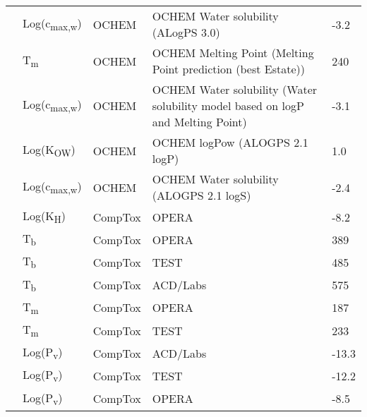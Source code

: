 \begin{landscape}
\begin{longtable}[c]{lllll}
          & Log(c\textsubscript{max,w}) & OCHEM      & OCHEM Water solubility (ALogPS 3.0)                                             & -3.2  \\
          & T\textsubscript{m}          & OCHEM      & OCHEM Melting Point (Melting Point prediction (best Estate))                    & 240   \\
          & Log(c\textsubscript{max,w}) & OCHEM      & OCHEM Water solubility (Water solubility model based on logP and Melting Point) & -3.1  \\
          & Log(K\textsubscript{OW})      & OCHEM      & OCHEM logPow (ALOGPS 2.1 logP)                                                  & 1.0   \\
          & Log(c\textsubscript{max,w}) & OCHEM      & OCHEM Water solubility (ALOGPS 2.1 logS)                                        & -2.4  \\
          & Log(K\textsubscript{H})       & CompTox    & OPERA                                                                           & -8.2  \\
          & T\textsubscript{b}          & CompTox    & OPERA                                                                           & 389   \\
          & T\textsubscript{b}          & CompTox    & TEST                                                                            & 485   \\
          & T\textsubscript{b}          & CompTox    & ACD/Labs                                                                        & 575   \\
          & T\textsubscript{m}          & CompTox    & OPERA                                                                           & 187   \\
          & T\textsubscript{m}          & CompTox    & TEST                                                                            & 233   \\
          & Log(P\textsubscript{v})       & CompTox    & ACD/Labs                                                                        & -13.3 \\
          & Log(P\textsubscript{v})       & CompTox    & TEST                                                                            & -12.2 \\
          & Log(P\textsubscript{v})       & CompTox    & OPERA                                                                           & -8.5  \\

\end{longtable}
\end{landscape}
